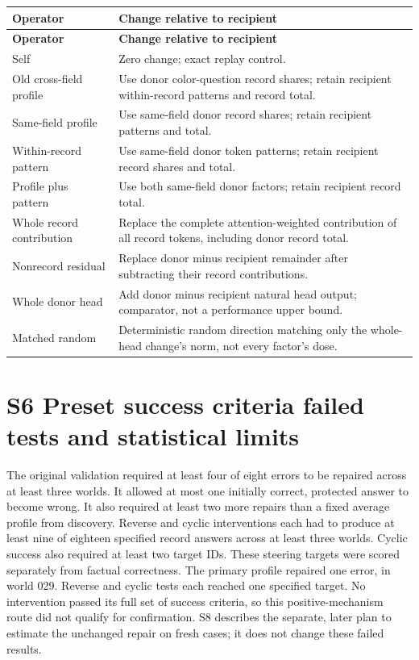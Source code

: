 \documentclass[10pt,letterpaper]{article}
\begin{document}
\begingroup\small{}
\begin{longtable}{|>{\raggedright\arraybackslash}p{}|>{\raggedright\arraybackslash}p{}|}
\hline
\textbf{Operator} & \textbf{Change relative to recipient}\\\hline
\endfirsthead
\hline
\textbf{Operator} & \textbf{Change relative to recipient}\\\hline
\endhead
Self & Zero change; exact replay control.\\\hline
Old cross-field profile & Use donor color-question record shares; retain recipient within-record patterns and record total.\\\hline
Same-field profile & Use same-field donor record shares; retain recipient patterns and total.\\\hline
Within-record pattern & Use same-field donor token patterns; retain recipient record shares and total.\\\hline
Profile plus pattern & Use both same-field donor factors; retain recipient record total.\\\hline
Whole record contribution & Replace the complete attention-weighted contribution of all record tokens, including donor record total.\\\hline
Nonrecord residual & Replace donor minus recipient remainder after subtracting their record contributions.\\\hline
Whole donor head & Add donor minus recipient natural head output; comparator, not a performance upper bound.\\\hline
Matched random & Deterministic random direction matching only the whole-head change's norm, not every factor's dose.\\\hline
\end{longtable}
\endgroup

\section*{S6 Preset success criteria failed tests and statistical limits}

The original validation required at least four of eight errors to be repaired across at least three worlds. It allowed at most one initially correct, protected answer to become wrong. It also required at least two more repairs than a fixed average profile from discovery. Reverse and cyclic interventions each had to produce at least nine of eighteen specified record answers across at least three worlds. Cyclic success also required at least two target IDs. These steering targets were scored separately from factual correctness. The primary profile repaired one error, in world 029. Reverse and cyclic tests each reached one specified target. No intervention passed its full set of success criteria, so this positive-mechanism route did not qualify for confirmation. S8 describes the separate, later plan to estimate the unchanged repair on fresh cases; it does not change these failed results.
\end{document}
